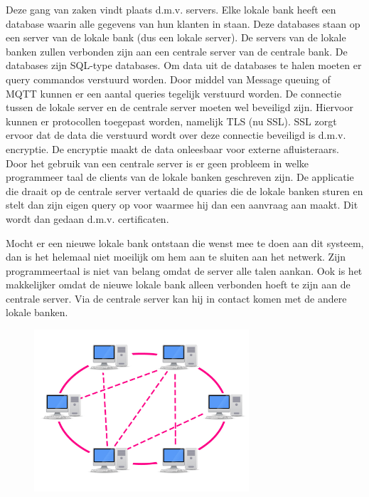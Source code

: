 \documentclass{article}
\begin{document}
Deze gang van zaken vindt plaats d.m.v. servers.
Elke lokale bank heeft een database waarin alle gegevens van hun klanten in staan.
Deze databases staan op een server van de lokale bank (dus een lokale server).
De servers van de lokale banken zullen verbonden zijn aan een centrale server
van de centrale bank.
De databases zijn SQL-type databases.
Om data uit de databases te halen moeten er query commandos verstuurd worden.
Door middel van Message queuing of MQTT kunnen er een aantal queries tegelijk verstuurd worden.
De connectie tussen de lokale server en de centrale server moeten wel beveiligd zijn.
Hiervoor kunnen er protocollen toegepast worden, namelijk TLS (nu SSL).
SSL zorgt ervoor dat de data die verstuurd wordt over deze connectie beveiligd is
d.m.v. encryptie.
De encryptie maakt de data onleesbaar voor externe afluisteraars.
Door het gebruik van een centrale server is er geen probleem in welke
programmeer taal de clients van de lokale banken geschreven zijn.
De applicatie die draait op de centrale server vertaald de quaries
die de lokale banken sturen en stelt dan zijn eigen query op voor
waarmee hij dan een aanvraag aan maakt.
Dit wordt dan gedaan d.m.v. certificaten. 

Mocht er een nieuwe lokale bank ontstaan die wenst mee te doen aan dit systeem,
dan is het helemaal niet moeilijk om hem aan te sluiten aan het netwerk.
Zijn programmeertaal is niet van belang omdat de server alle talen aankan.
Ook is het makkelijker omdat de nieuwe lokale bank alleen verbonden
hoeft te zijn aan de centrale server.
Via de centrale server kan hij in contact komen met de andere lokale banken.

\vspace{5mm}

\begin{figure}[h]
\includegraphics[height=6cm, width=8cm]{peertopeer.jpg}
\centering
\end{figure}
\end{document}

